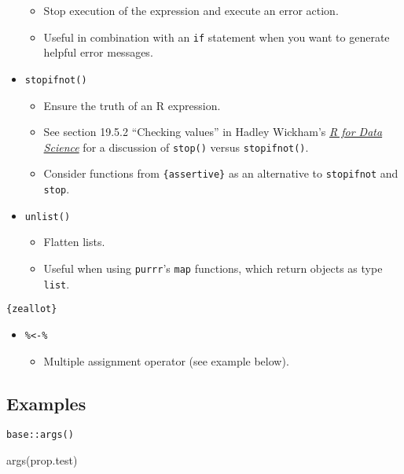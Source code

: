 \documentclass[
]{book}
\newenvironment{Shaded}{\begin{snugshade}}{\end{snugshade}}
\newcommand{\FunctionTok}[1]{\textcolor[rgb]{0.00,0.00,0.00}{#1}}
\newcommand{\NormalTok}[1]{#1}
\providecommand{\tightlist}{%
  \setlength{\itemsep}{0pt}\setlength{\parskip}{0pt}}
\begin{document}
\begin{itemize}
  \begin{itemize}
  \tightlist
  \item
    Stop execution of the expression and execute an error action.
  \item
    Useful in combination with an \texttt{if} statement when you want to generate helpful error messages.
  \end{itemize}
\item
  \texttt{stopifnot()}

  \begin{itemize}
  \tightlist
  \item
    Ensure the truth of an R expression.
  \item
    See section 19.5.2 ``Checking values'' in Hadley Wickham's \href{https://r4ds.had.co.nz/functions.html}{\emph{R for Data Science}} for a discussion of \texttt{stop()} versus \texttt{stopifnot()}.
  \item
    Consider functions from \texttt{\{assertive\}} as an alternative to \texttt{stopifnot} and \texttt{stop}.
  \end{itemize}
\item
  \texttt{unlist()}

  \begin{itemize}
  \tightlist
  \item
    Flatten lists.
  \item
    Useful when using \texttt{purrr}'s \texttt{map} functions, which return objects as type \texttt{list}.
  \end{itemize}
\end{itemize}

\texttt{\{zeallot\}}

\begin{itemize}
\tightlist
\item
  \texttt{\%\textless{}-\%}

  \begin{itemize}
  \tightlist
  \item
    Multiple assignment operator (see example below).
  \end{itemize}
\end{itemize}

\hypertarget{examples-7}{%
\subsection{Examples}\label{examples-7}}

\texttt{base::args()}

\begin{Shaded}
\begin{Highlighting}[]
\FunctionTok{args}\NormalTok{(prop.test)}
\end{Highlighting}
\end{Shaded}
\end{document}
